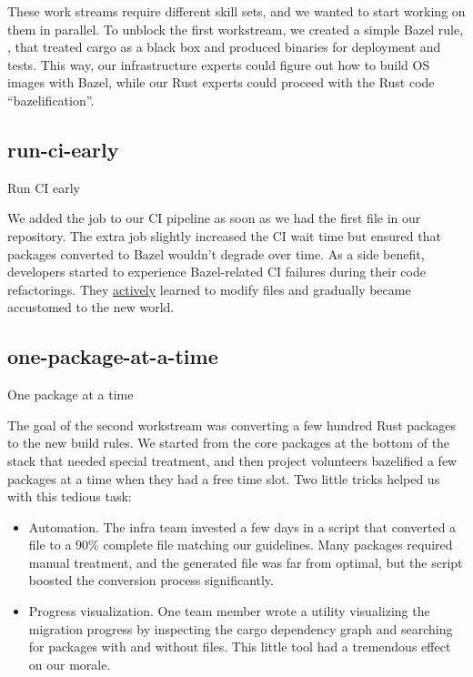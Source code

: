 \documentclass{article}
\begin{document}
These work streams require different skill sets, and we wanted to start working on them in parallel.
To unblock the first workstream, we created a simple Bazel rule, , that treated cargo as a black box and produced binaries for deployment and tests.
This way, our infrastructure experts could figure out how to build OS images with Bazel, while our Rust experts could proceed with the Rust code ``bazelification''.

\subsection{run-ci-early}{Run CI early}

We added the  job to our CI pipeline as soon as we had the first  file in our repository.
The extra job slightly increased the CI wait time but ensured that packages converted to Bazel wouldn't degrade over time.
As a side benefit, developers started to experience Bazel-related CI failures during their code refactorings.
They \href{https://en.wikipedia.org/wiki/Active_learning}{actively} learned to modify  files and gradually became accustomed to the new world.

\subsection{one-package-at-a-time}{One package at a time}

The goal of the second workstream was converting a few hundred Rust packages to the new build rules.
We started from the core packages at the bottom of the stack that needed special treatment, and then project volunteers bazelified a few packages at a time when they had a free time slot.
Two little tricks helped us with this tedious task:
\begin{itemize}
  \item 
    Automation.
    The infra team invested a few days in a script that converted a  file to a 90\% complete  file matching our guidelines.
    Many packages required manual treatment, and the generated  file was far from optimal, but the script boosted the conversion process significantly.
  \item 
    Progress visualization.
    One team member wrote a utility visualizing the migration progress by inspecting the cargo dependency graph and searching for packages with and without  files.
    This little tool had a tremendous effect on our morale.
\end{itemize}
\end{document}
